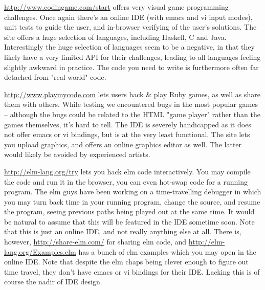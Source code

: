 \url{http://www.codingame.com/start} offers very visual game programming 
challenges. Once again there's an online IDE (with emacs and vi input modes), 
unit tests to guide the user, and in-browser verifying of the user's 
solutions. The site offers a huge selection of languages, including Haskell, C 
and Java. Interestingly the huge selection of languages seem to be a negative, 
in that they likely have a very limited API for their challenges, leading to 
all languages feeling slightly awkward in practice. The code you need to write 
is furthermore often far detached from "real world" code.

\url{http://www.playmycode.com} lets users hack \& play Ruby games, as well as 
share them with others. While testing we encountered bugs in the most popular 
games -- although the bugs could be related to the HTML "game player" rather 
than the games themselves, it's hard to tell. The IDE is severely handicapped 
as it does not offer emacs or vi bindings, but is at the very least 
functional. The site lets you upload graphics, and offers an online graphics 
editor as well. The latter would likely be avoided by experienced artists.

\url{http://elm-lang.org/try} lets you hack elm code interactively. You may 
compile the code and run it in the browser, you can even hot-swap code for a 
running program. The elm guys have been working on a time-travelling debugger 
in which you may turn back time in your running program, change the source, 
and resume the program, seeing previous paths being played out at the same 
time. It would be natural to assume that this will be featured in the IDE 
sometime soon. Note that this is just an online IDE, and not really anything 
else at all. There is, however, \url{http://share-elm.com/} for sharing elm 
code, and \url{http://elm-lang.org/Examples.elm} has a bunch of elm examples 
which you may open in the online IDE. Note that despite the elm chaps being 
clever enough to figure out time travel, they don't have emacs or vi bindings 
for their IDE. Lacking this is of course the nadir of IDE design.
